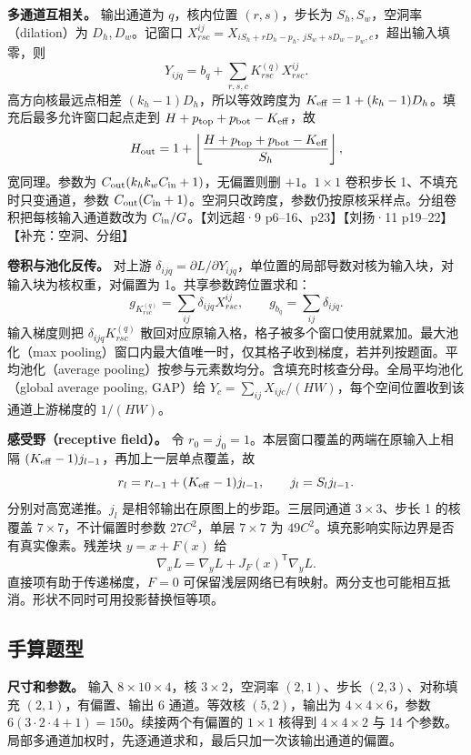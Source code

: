 \documentclass[UTF8,a4paper,zihao=-4,fontset=fandol]{ctexart}
\begin{document}
\textbf{多通道互相关。} 输出通道为 $q$，核内位置 $(r,s)$，步长为 $S_h,S_w$，空洞率（dilation）为 $D_h,D_w$。记窗口 $X^{ij}_{rsc}=X_{iS_h+rD_h-p_h,\ jS_w+sD_w-p_w,c}$，超出输入填零，则
\[
 Y_{ijq}=b_q+\sum_{r,s,c}K^{(q)}_{rsc}X^{ij}_{rsc}.
\]
高方向核最远点相差 $(k_h-1)D_h$，所以等效跨度为 $K_{\rm eff}=1+(k_h-1)D_h$。填充后最多允许窗口起点走到 $H+p_{\rm top}+p_{\rm bot}-K_{\rm eff}$，故
\[
 H_{\rm out}=1+\left\lfloor
 \frac{H+p_{\rm top}+p_{\rm bot}-K_{\rm eff}}{S_h}
 \right\rfloor ,
\]
宽同理。参数为 $C_{\rm out}(k_hk_wC_{\rm in}+1)$，无偏置则删 $+1$。$1\times1$ 卷积步长 1、不填充时只变通道，参数 $C_{\rm out}(C_{\rm in}+1)$。空洞只改跨度，参数仍按原核采样点。分组卷积把每核输入通道数改为 $C_{\rm in}/G$。【刘远超·9 p6--16、p23】【刘扬·11 p19--22】【补充：空洞、分组】

\textbf{卷积与池化反传。} 对上游 $\delta_{ijq}=\partial L/\partial Y_{ijq}$，单位置的局部导数对核为输入块，对输入块为核权重，对偏置为 1。共享参数跨位置求和：
\[
 g_{K^{(q)}_{rsc}}=\sum_{ij}\delta_{ijq}X^{ij}_{rsc},
 \qquad g_{b_q}=\sum_{ij}\delta_{ijq}.
\]
输入梯度则把 $\delta_{ijq}K^{(q)}_{rsc}$ 散回对应原输入格，格子被多个窗口使用就累加。最大池化（max pooling）窗口内最大值唯一时，仅其格子收到梯度，若并列按题面。平均池化（average pooling）按参与元素数均分。含填充时核查分母。全局平均池化（global average pooling, GAP）给 $Y_c=\sum_{ij}X_{ijc}/(HW)$，每个空间位置收到该通道上游梯度的 $1/(HW)$。

\textbf{感受野（receptive field）。} 令 $r_0=j_0=1$。本层窗口覆盖的两端在原输入上相隔 $(K_{\rm eff}-1)j_{l-1}$，再加上一层单点覆盖，故
\[
 r_l=r_{l-1}+(K_{\rm eff}-1)j_{l-1},\qquad
 j_l=S_l j_{l-1}.
\]
分别对高宽递推。$j_l$ 是相邻输出在原图上的步距。三层同通道 $3\times3$、步长 1 的核覆盖 $7\times7$，不计偏置时参数 $27C^2$，单层 $7\times7$ 为 $49C^2$。填充影响实际边界是否有真实像素。残差块 $y=x+F(x)$ 给
\[
 \nabla_x L=\nabla_y L+J_F(x)^{\mathsf T}\nabla_y L.
\]
直接项有助于传递梯度，$F=0$ 可保留浅层网络已有映射。两分支也可能相互抵消。形状不同时可用投影替换恒等项。

\subsection{手算题型}

\textbf{尺寸和参数。} 输入 $8\times10\times4$，核 $3\times2$，空洞率 $(2,1)$、步长 $(2,3)$、对称填充 $(2,1)$，有偏置、输出 6 通道。等效核 $(5,2)$，输出为 $4\times4\times6$，参数 $6(3\cdot2\cdot4+1)=150$。续接两个有偏置的 $1\times1$ 核得到 $4\times4\times2$ 与 14 个参数。局部多通道加权时，先逐通道求和，最后只加一次该输出通道的偏置。
\end{document}
